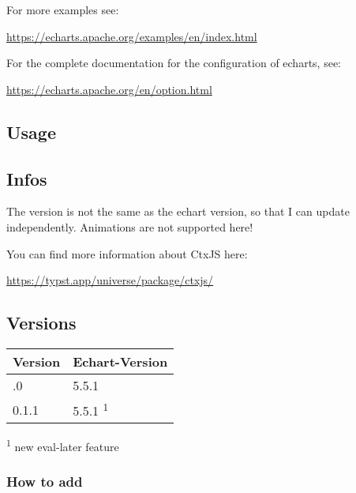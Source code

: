 For more examples see:

\url{https://echarts.apache.org/examples/en/index.html}

For the complete documentation for the configuration of echarts, see:

\url{https://echarts.apache.org/en/option.html}

\subsection{Usage}\label{usage}

\begin{Shaded}
\begin{Highlighting}[]

\end{Highlighting}
\end{Shaded}

\subsection{Infos}\label{infos}

The version is not the same as the echart version, so that I can update
independently. Animations are not supported here!

You can find more information about CtxJS here:

\url{https://typst.app/universe/package/ctxjs/}

\subsection{Versions}\label{versions}

\begin{longtable}[]{@{}ll@{}}
\toprule\noalign{}
Version & Echart-Version \\
\midrule\noalign{}
\endhead
\bottomrule\noalign{}
\endlastfoot
0.1.0 & 5.5.1 \\
0.1.1 & 5.5.1 \textsuperscript{1} \\
\end{longtable}

\textsuperscript{1} new eval-later feature

\subsubsection{How to add}\label{how-to-add}

